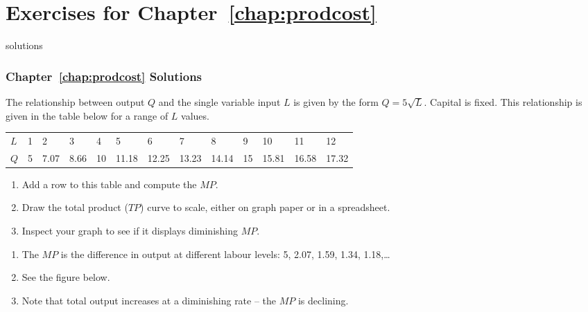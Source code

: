 \newpage
\section*{Exercises for Chapter~\ref{chap:prodcost}}

\begin{Filesave}{solutions}
\subsubsection*{Chapter~\ref{chap:prodcost} Solutions}
\end{Filesave}

\begin{enumialphparenastyle}

\begin{econex}\label{ex:ch8ex1}
The relationship between output $Q$ and the single variable input $L$ is given by the form $Q=5\sqrt{L}$. Capital is fixed. This relationship is given in the table below for a range of $L$ values.
\begin{Table}{}
\begin{tabu} to \linewidth {|X[1,c]X[1,c]X[1,c]X[1,c]X[1,c]X[1,c]X[1,c]X[1,c]X[1,c]X[1,c]X[1,c]X[1,c]X[1,c]|}	\hline
{}	$L$ & 1 & 2 & 3 & 4 & 5 & 6 & 7 & 8 & 9 & 10 & 11 & 12 \\ 
						$Q$ & 5 & 7.07 & 8.66 & 10 & 11.18 & 12.25 & 13.23 & 14.14 & 15 & 15.81 & 16.58 & 17.32	\\	\hline
\end{tabu}
\end{Table}
\begin{enumerate}
	\item	Add a row to this table and compute the $MP$.
	\item	Draw the total product ($TP$) curve to scale, either on graph paper or in a spreadsheet.
	\item	Inspect your graph to see if it displays diminishing $MP$.
\end{enumerate}
\begin{econsolution}
\begin{enumerate}
	\item	The $MP$ is the difference in output at different labour levels: 5, 2.07, 1.59, 1.34, 1.18,\ldots
	\item	See the figure below.
	\item	Note that total output increases at a diminishing rate -- the $MP$ is declining.
\end{enumerate}
\begin{center*}

\end{center*}
\end{econsolution}
\end{econex}
\end{enumialphparenastyle}

